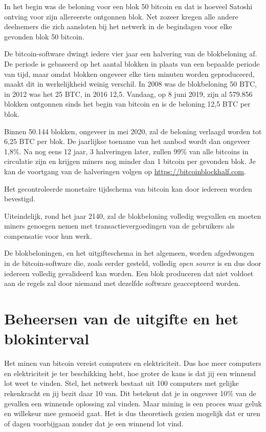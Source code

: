 \documentclass[
  letterpaper,
]{scrbook}
\begin{document}
In het begin was de beloning voor een blok 50 bitcoin en dat is hoeveel
Satoshi ontving voor zijn allereerste ontgonnen blok. Net zozeer kregen
alle andere deelnemers die zich aansloten bij het netwerk in de
begindagen voor elke gevonden blok 50 bitcoin.

De bitcoin-software dwingt iedere vier jaar een halvering van de
blokbeloning af. De periode is gebaseerd op het aantal blokken in plaats
van een bepaalde periode van tijd, maar omdat blokken ongeveer elke tien
minuten worden geproduceerd, maakt dit in werkelijkheid weinig verschil.
In 2008 was de blokbeloning 50 BTC, in 2012 was het 25 BTC, in 2016
12,5. Vandaag, op 8 juni 2019, zijn al 579.856 blokken ontgonnen sinds
het begin van bitcoin en is de beloning 12,5 BTC per blok.

Binnen 50.144 blokken, ongeveer in mei 2020, zal de beloning verlaagd
worden tot 6,25 BTC per blok. De jaarlijkse toename van het aanbod wordt
dan ongeveer 1,8\%. Na nog eens 12 jaar, 3 halveringen later, zullen
99\% van alle bitcoins in circulatie zijn en krijgen miners nog minder
dan 1 bitcoin per gevonden blok. Je kan de voortgang van de halveringen
volgen op \url{https://bitcoinblockhalf.com}.

{Het gecontroleerde monetaire tijdschema van bitcoin kan door iedereen
worden bevestigd.}

Uiteindelijk, rond het jaar 2140, zal de blokbeloning volledig wegvallen
en moeten miners genoegen nemen met transactievergoedingen van de
gebruikers als compensatie voor hun werk.

De blokbeloningen, en het uitgifteschema in het algemeen, worden
afgedwongen in de bitcoin-software die, zoals eerder gesteld, volledig
\emph{open source} is en dus door iedereen volledig gevalideerd kan
worden. Een blok produceren dat niet voldoet aan de regels zal door
niemand met dezelfde software geaccepteerd worden.

\hypertarget{beheersen-van-de-uitgifte-en-het-blokinterval}{%
\section{Beheersen van de uitgifte en het
blokinterval}\label{beheersen-van-de-uitgifte-en-het-blokinterval}}

Het minen van bitcoin vereist computers en elektriciteit. Dus hoe meer
computers en elektriciteit je ter beschikking hebt, hoe groter de kans
is dat jij een winnend lot weet te vinden. Stel, het netwerk bestaat uit
100 computers met gelijke rekenkracht en jij bezit daar 10 van. Dit
betekent dat je in ongeveer 10\% van de gevallen een winnende oplossing
zal vinden. Maar mining is een proces waar geluk en willekeur mee
gemoeid gaat. Het is dus theoretisch gezien mogelijk dat er uren of
dagen voorbijgaan zonder dat je een winnend lot vind.
\end{document}
